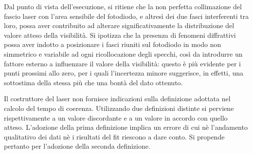 \documentclass[10pt,oneside,a4paper]{article}
\begin{document}
\begin{multicols}{2}
Dal punto di vista dell'esecuzione, si ritiene che la non perfetta collimazione del fascio laser con l'area sensibile del fotodiodo, e altresì dei due fasci interferenti tra loro, possa aver contribuito ad alterare significativamente la distribuzione del valore atteso della visibilità. Si ipotizza che la presenza di fenomeni diffrattivi possa aver indotto a posizionare i fasci riuniti sul fotodiodo in modo non simmetrico e variabile ad ogni ricollocazione degli specchi, così da introdurre un fattore esterno a influenzare il valore della visibilità: questo è più evidente per i punti prossimi allo zero, per i quali l'incertezza minore suggerisce, in effetti, una sottostima della stessa più che una bontà del dato ottenuto. 

Il costruttore del laser non fornisce indicazioni sulla definizione adottata nel calcolo del tempo di coerenza. Utilizzando due definizioni distinte si perviene rispettivamente a un valore discordante e a un valore in accordo con quello atteso. L'adozione della prima definizione implica un errore di cui nè l'andamento qualitativo dei dati nè i risultati del fit riescono a dare conto. Si propende pertanto per l'adozione della seconda definizione.





\end{multicols}


\newpage
\end{document}
